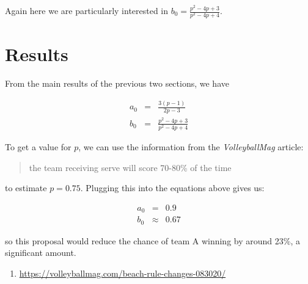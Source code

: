 \documentclass[a4paper,12pt]{article}
\begin{document}
Again here we are particularly interested in $b_0 = \frac{p^{2} - 4 p +
3}{p^{2} - 4 p + 4}$.

\section{Results}

From the main results of the previous two sections, we have

\begin{eqnarray*}
  a_0 & = & \frac{3 \left(p - 1\right)}{2 p - 3} \\
  b_0 & = & \frac{p^{2} - 4 p + 3}{p^{2} - 4 p + 4}
\end{eqnarray*}

To get a value for $p$, we can use the information from the
\textit{VolleyballMag} article:

\begin{quote}
  the team receiving serve will score 70-80\% of the time
\end{quote}

to estimate $p = 0.75$. Plugging this into the equations above gives us:

\begin{eqnarray*}
  a_0 & = & 0.9 \\
  b_0 & \approx & 0.67
\end{eqnarray*}

so this proposal would reduce the chance of team A winning by around 23\%, a
significant amount.

\begin{enumerate}
  \item \url{https://volleyballmag.com/beach-rule-changes-083020/}
\end{enumerate}
\end{document}
